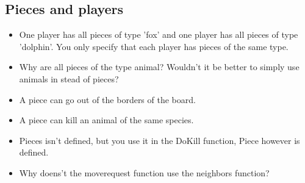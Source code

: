 \documentclass[a4paper,11pt]{article}
\begin{document}
    \subsection{Pieces and players}
    \begin{itemize}
        \item One player has all pieces of type 'fox' and one player has all pieces of type 'dolphin'. You only specify that each player has pieces of the same type.
        \item Why are all pieces of the type animal? Wouldn't it be better to simply use animals in stead of pieces?
        \item A piece can go out of the borders of the board.
        \item A piece can kill an animal of the same species.
        \item Pieces isn't defined, but you use it in the DoKill function, Piece however is defined.
        \item Why doens't the moverequest function use the neighbors function?
    \end{itemize}
\end{document}
